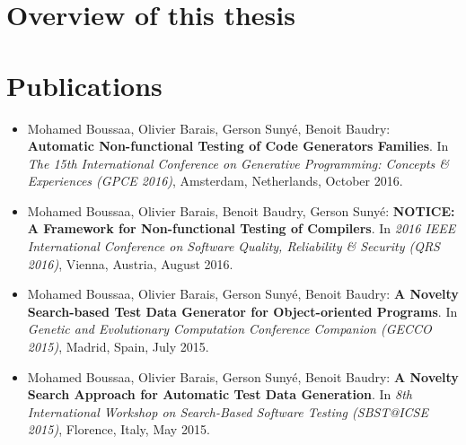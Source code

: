 \section{Overview of this thesis}

\section{Publications}

\begin{itemize}
	
	\item Mohamed Boussaa, Olivier Barais, Gerson Sunyé, Benoit Baudry:
	\textbf{Automatic Non-functional Testing of Code Generators Families}. In
	\textit{The 15th International Conference on Generative Programming: Concepts \& Experiences (GPCE 2016)},
	Amsterdam, Netherlands, October 2016.

	\item Mohamed Boussaa, Olivier Barais, Benoit Baudry, Gerson Sunyé:
	\textbf{NOTICE: A Framework for Non-functional Testing of Compilers}. In 
	\textit{2016 IEEE International Conference on Software Quality, Reliability \& Security (QRS 2016)}, Vienna, Austria, August 2016.
	
	\item Mohamed Boussaa, Olivier Barais, Gerson Sunyé, Benoit Baudry:
	\textbf{A Novelty Search-based Test Data Generator for Object-oriented Programs}. In 
	\textit{Genetic and Evolutionary Computation Conference Companion (GECCO 2015)}, 
	Madrid, Spain, July 2015.
	
	\item Mohamed Boussaa, Olivier Barais, Gerson Sunyé, Benoit Baudry:
	\textbf{A Novelty Search Approach for Automatic Test Data Generation}. In
	\textit{8th International Workshop on Search-Based Software Testing (SBST@ICSE 2015)}, 
	Florence, Italy, May 2015.

	
	
\end{itemize}



